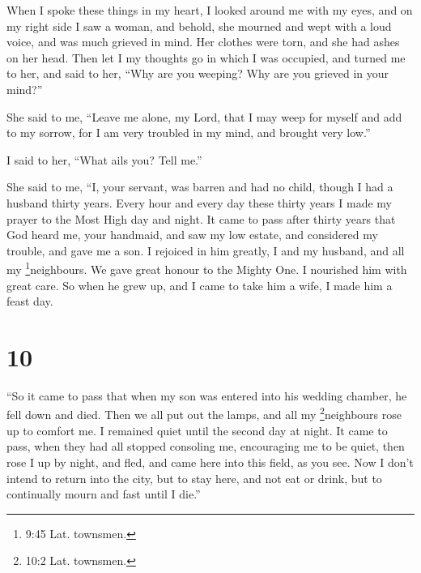  When I spoke these things in my heart, I looked around me
with my eyes, and on my right side I saw a woman, and behold, she
mourned and wept with a loud voice, and was much grieved in mind. Her
clothes were torn, and she had ashes on her head.  Then let
I my thoughts go in which I was occupied, and turned me to her,
 and said to her, ``Why are you weeping? Why are you
grieved in your mind?''

 She said to me, ``Leave me alone, my Lord, that I may weep
for myself and add to my sorrow, for I am very troubled in my mind, and
brought very low.''

 I said to her, ``What ails you? Tell me.''

 She said to me, ``I, your servant, was barren and had no
child, though I had a husband thirty years.  Every hour and
every day these thirty years I made my prayer to the Most High day and
night.  It came to pass after thirty years that God heard
me, your handmaid, and saw my low estate, and considered my trouble, and
gave me a son. I rejoiced in him greatly, I and my husband, and all my
\footnote{9:45 Lat. townsmen.}neighbours. We gave great honour to the
Mighty One.  I nourished him with great care. 
So when he grew up, and I came to take him a wife, I made him a feast
day.

\hypertarget{section-9}{%
\section{10}\label{section-9}}

 ``So it came to pass that when my son was entered into his
wedding chamber, he fell down and died.  Then we all put out
the lamps, and all my \footnote{10:2 Lat. townsmen.}neighbours rose up
to comfort me. I remained quiet until the second day at night.
 It came to pass, when they had all stopped consoling me,
encouraging me to be quiet, then rose I up by night, and fled, and came
here into this field, as you see.  Now I don't intend to
return into the city, but to stay here, and not eat or drink, but to
continually mourn and fast until I die.''

